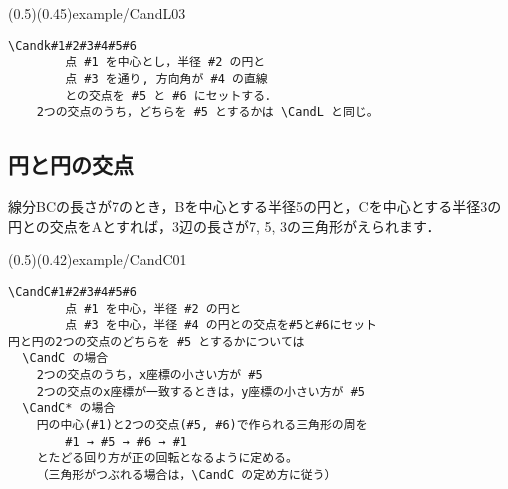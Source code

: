 (0.5)(0.45){example/CandL03}

\begin{boxnote}
\begin{verbatim}
\Candk#1#2#3#4#5#6
        点 #1 を中心とし，半径 #2 の円と
        点 #3 を通り, 方向角が #4 の直線
        との交点を #5 と #6 にセットする．
    2つの交点のうち，どちらを #5 とするかは \CandL と同じ。
\end{verbatim}
\end{boxnote}

\subsection{円と円の交点 \texorpdfstring{}{CandC}}
線分BCの長さが7のとき，Bを中心とする半径5の円と，Cを中心とする半径3の
円との交点をAとすれば，3辺の長さが7, 5, 3の三角形がえられます．

(0.5)(0.42){example/CandC01}

\begin{boxnote}
\begin{verbatim}
\CandC#1#2#3#4#5#6
        点 #1 を中心，半径 #2 の円と
        点 #3 を中心，半径 #4 の円との交点を#5と#6にセット
円と円の2つの交点のどちらを #5 とするかについては
  \CandC の場合
    2つの交点のうち，x座標の小さい方が #5
    2つの交点のx座標が一致するときは，y座標の小さい方が #5
  \CandC* の場合
    円の中心(#1)と2つの交点(#5, #6)で作られる三角形の周を
        #1 → #5 → #6 → #1
    とたどる回り方が正の回転となるように定める。
    （三角形がつぶれる場合は，\CandC の定め方に従う）
\end{verbatim}
\end{boxnote}
